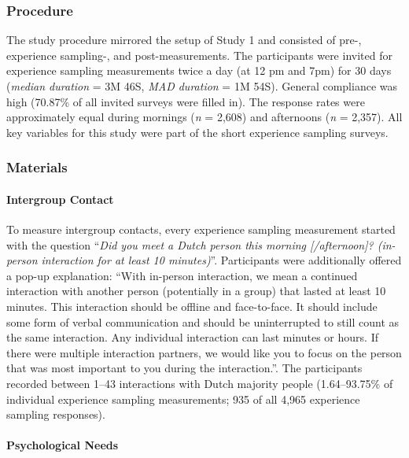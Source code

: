 \subsubsection{Procedure}

The study procedure mirrored the setup of Study 1 and consisted of pre-,
experience sampling-, and post-measurements. The participants were
invited for experience sampling measurements twice a day (at 12 pm and
7pm) for 30 days (\textit{median duration} = 3M 46S,
\textit{MAD duration} = 1M 54S). General compliance was high (70.87\% of
all invited surveys were filled in). The response rates were
approximately equal during mornings (\textit{n} = 2,608) and afternoons
(\textit{n} = 2,357). All key variables for this study were part of the
short experience sampling surveys.

\subsubsection{Materials}

\paragraph{Intergroup Contact}

To measure intergroup contacts, every experience sampling measurement
started with the question
``\textit{Did you meet a Dutch person this morning [/afternoon]? (in-person interaction for at least 10 minutes)}''.
Participants were additionally offered a pop-up explanation: ``With
in-person interaction, we mean a continued interaction with another
person (potentially in a group) that lasted at least 10 minutes. This
interaction should be offline and face-to-face. It should include some
form of verbal communication and should be uninterrupted to still count
as the same interaction. Any individual interaction can last minutes or
hours. If there were multiple interaction partners, we would like you to
focus on the person that was most important to you during the
interaction.''. The participants recorded between 1--43 interactions
with Dutch majority people (1.64--93.75\% of individual experience
sampling measurements; 935 of all 4,965 experience sampling responses).

\paragraph{Psychological Needs}

